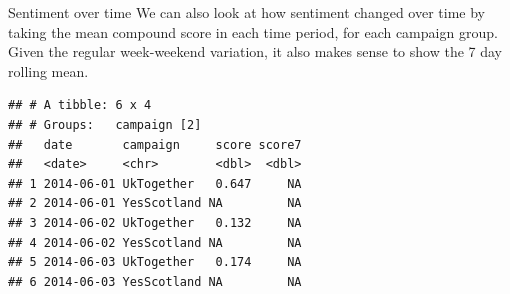\documentclass[
  10pt,
  ignorenonframetext,
  aspectratio=169]{beamer}
\newenvironment{Shaded}{\begin{snugshade}}{\end{snugshade}}
\newcommand{\AttributeTok}[1]{\textcolor[rgb]{0.80,0.80,0.80}{#1}}
\newcommand{\DecValTok}[1]{\textcolor[rgb]{0.86,0.86,0.80}{#1}}
\newcommand{\FunctionTok}[1]{\textcolor[rgb]{0.94,0.94,0.56}{#1}}
\newcommand{\NormalTok}[1]{\textcolor[rgb]{0.80,0.80,0.80}{#1}}
\newcommand{\OtherTok}[1]{\textcolor[rgb]{0.94,0.94,0.56}{#1}}
\newcommand{\SpecialCharTok}[1]{\textcolor[rgb]{0.86,0.64,0.64}{#1}}
\newcommand{\StringTok}[1]{\textcolor[rgb]{0.80,0.58,0.58}{#1}}
\begin{document}
\begin{frame}[fragile]{Sentiment over time}
\protect\hypertarget{sentiment-over-time}{}
We can also look at how sentiment changed over time by taking the mean
compound score in each time period, for each campaign group. Given the
regular week-weekend variation, it also makes sense to show the 7 day
rolling mean.

\medskip
\scriptsize

\begin{Shaded}
\end{Shaded}

\begin{verbatim}
## # A tibble: 6 x 4
## # Groups:   campaign [2]
##   date       campaign     score score7
##   <date>     <chr>        <dbl>  <dbl>
## 1 2014-06-01 UkTogether   0.647     NA
## 2 2014-06-01 YesScotland NA         NA
## 3 2014-06-02 UkTogether   0.132     NA
## 4 2014-06-02 YesScotland NA         NA
## 5 2014-06-03 UkTogether   0.174     NA
## 6 2014-06-03 YesScotland NA         NA
\end{verbatim}
\end{frame}
\end{document}
